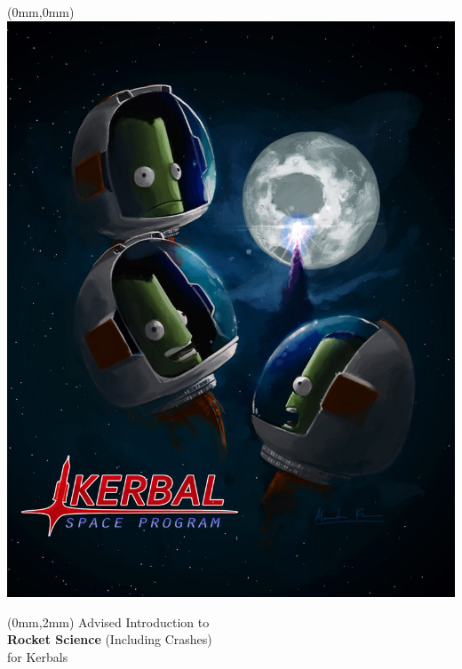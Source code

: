 \begin{titlepage}

\thispagestyle{empty}
\begin{textblock*}{\paperwidth}(0mm,0mm)
\noindent\includegraphics{img/front.jpg}
\end{textblock*}

\begin{textblock*}{\paperwidth}(0mm,2mm){
\centering \color{title}
\fontsize{1cm}{1em}\selectfont
Advised Introduction to \\
\fontsize{2cm}{1em}\selectfont
\textbf{Rocket Science}
\fontsize{0.5cm}{1em}\selectfont
(Including Crashes) \\
\fontsize{1cm}{1em}\selectfont
for Kerbals \\
}\end{textblock*}

\mbox{}
\newpage
\end{titlepage}
